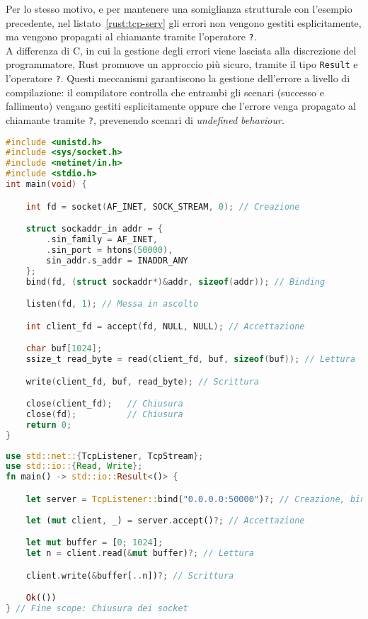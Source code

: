 Per lo stesso motivo, e per mantenere una somiglianza strutturale con l'esempio precedente, nel listato~\ref{rust:tcp-serv} gli errori non
vengono gestiti esplicitamente, ma vengono propagati al chiamante tramite l'operatore \texttt{?}.\hfill 
\vspace{8pt}\\
\noindent A differenza di C, in cui la gestione degli errori viene lasciata alla discrezione del programmatore, Rust promuove un approccio più sicuro, tramite
il tipo \texttt{Result} e l'operatore \texttt{?}. Questi meccanismi garantiscono la gestione dell'errore a livello di compilazione: il compilatore controlla che entrambi gli scenari (successo e fallimento) vengano
gestiti esplicitamente oppure che l'errore venga propagato al chiamante tramite \texttt{?}, prevenendo scenari di \textit{undefined behaviour}.
\begin{lstlisting}[language=C, float, caption={Semplice server TCP in C}, label={c:tcp-serv}]
#include <unistd.h>
#include <sys/socket.h>
#include <netinet/in.h>
#include <stdio.h>
int main(void) {

    int fd = socket(AF_INET, SOCK_STREAM, 0); // Creazione

    struct sockaddr_in addr = {
        .sin_family = AF_INET,
        .sin_port = htons(50000),
        sin_addr.s_addr = INADDR_ANY
    };
    bind(fd, (struct sockaddr*)&addr, sizeof(addr)); // Binding

    listen(fd, 1); // Messa in ascolto

    int client_fd = accept(fd, NULL, NULL); // Accettazione

    char buf[1024];
    ssize_t read_byte = read(client_fd, buf, sizeof(buf)); // Lettura

    write(client_fd, buf, read_byte); // Scrittura

    close(client_fd);   // Chiusura
    close(fd);          // Chiusura
    return 0;
}
\end{lstlisting}
\begin{lstlisting}[language=Rust, float, caption={Semplice server TCP in Rust}, label={rust:tcp-serv}]
use std::net::{TcpListener, TcpStream};
use std::io::{Read, Write};
fn main() -> std::io::Result<()> {

    let server = TcpListener::bind("0.0.0.0:50000")?; // Creazione, binding e messa in ascolto
    
    let (mut client, _) = server.accept()?; // Accettazione

    let mut buffer = [0; 1024];
    let n = client.read(&mut buffer)?; // Lettura

    client.write(&buffer[..n])?; // Scrittura

    Ok(())
} // Fine scope: Chiusura dei socket
\end{lstlisting}

